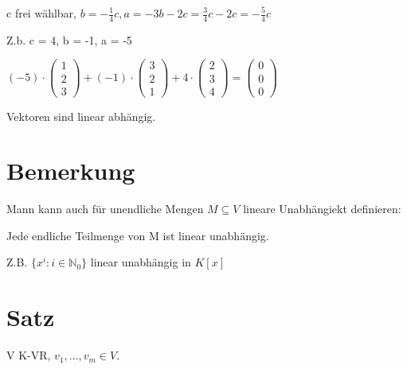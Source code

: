 \documentclass[a4paper, openany]{book}
\begin{document}
\begin{enumerate}[label=(\alph*)]
      c frei wählbar, $b = - \frac{1}{4} c, a = -3b - 2c = \frac{3}{4} c - 2c = - \frac{5}{4} c$

      Z.b. c = 4, b = -1, a = -5

      $(-5) \cdot \begin{pmatrix}1 \\ 2 \\ 3 \end{pmatrix} + (-1) \cdot \begin{pmatrix}3 \\ 2 \\ 1 \end{pmatrix} +  4 \cdot \begin{pmatrix}2 \\ 3 \\ 4 \end{pmatrix} = \begin{pmatrix} 0 \\ 0 \\ 0 \end{pmatrix}$

      Vektoren sind linear abhängig.
    \end{enumerate}

    \section{Bemerkung}

    Mann kann auch für unendliche Mengen $M \subseteq V$ lineare Unabhängiekt definieren:

    Jede endliche Teilmenge von M ist linear unabhängig.

    Z.B. $\{x^i : i \in \mathbb{N}_0\}$ linear  unabhängig in $K[x]$

    \section{Satz}

    V K-VR, $v_1,...,v_m \in V$.
\end{document}
